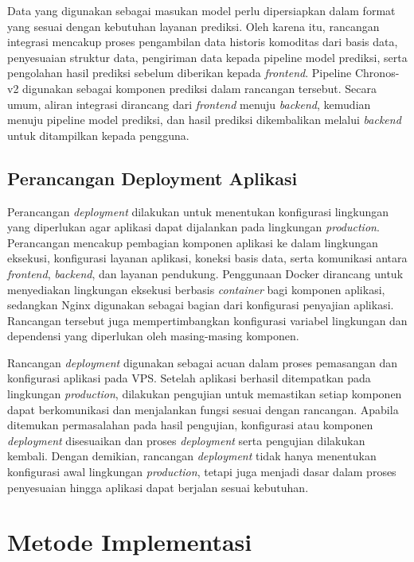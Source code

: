 Data yang digunakan sebagai masukan model perlu dipersiapkan dalam format yang sesuai dengan kebutuhan layanan prediksi. Oleh karena itu, rancangan integrasi mencakup proses pengambilan data historis komoditas dari basis data, penyesuaian struktur data, pengiriman data kepada pipeline model prediksi, serta pengolahan hasil prediksi sebelum diberikan kepada \textit{frontend}. Pipeline Chronos-v2 digunakan sebagai komponen prediksi dalam rancangan tersebut. Secara umum, aliran integrasi dirancang dari \textit{frontend} menuju \textit{backend}, kemudian menuju pipeline model prediksi, dan hasil prediksi dikembalikan melalui \textit{backend} untuk ditampilkan kepada pengguna.

\subsection{Perancangan Deployment Aplikasi}

Perancangan \textit{deployment} dilakukan untuk menentukan konfigurasi lingkungan yang diperlukan agar aplikasi dapat dijalankan pada lingkungan \textit{production}. Perancangan mencakup pembagian komponen aplikasi ke dalam lingkungan eksekusi, konfigurasi layanan aplikasi, koneksi basis data, serta komunikasi antara \textit{frontend}, \textit{backend}, dan layanan pendukung. Penggunaan Docker dirancang untuk menyediakan lingkungan eksekusi berbasis \textit{container} bagi komponen aplikasi, sedangkan Nginx digunakan sebagai bagian dari konfigurasi penyajian aplikasi. Rancangan tersebut juga mempertimbangkan konfigurasi variabel lingkungan dan dependensi yang diperlukan oleh masing-masing komponen.

Rancangan \textit{deployment} digunakan sebagai acuan dalam proses pemasangan dan konfigurasi aplikasi pada VPS. Setelah aplikasi berhasil ditempatkan pada lingkungan \textit{production}, dilakukan pengujian untuk memastikan setiap komponen dapat berkomunikasi dan menjalankan fungsi sesuai dengan rancangan. Apabila ditemukan permasalahan pada hasil pengujian, konfigurasi atau komponen \textit{deployment} disesuaikan dan proses \textit{deployment} serta pengujian dilakukan kembali. Dengan demikian, rancangan \textit{deployment} tidak hanya menentukan konfigurasi awal lingkungan \textit{production}, tetapi juga menjadi dasar dalam proses penyesuaian hingga aplikasi dapat berjalan sesuai kebutuhan.

\section{Metode Implementasi}

